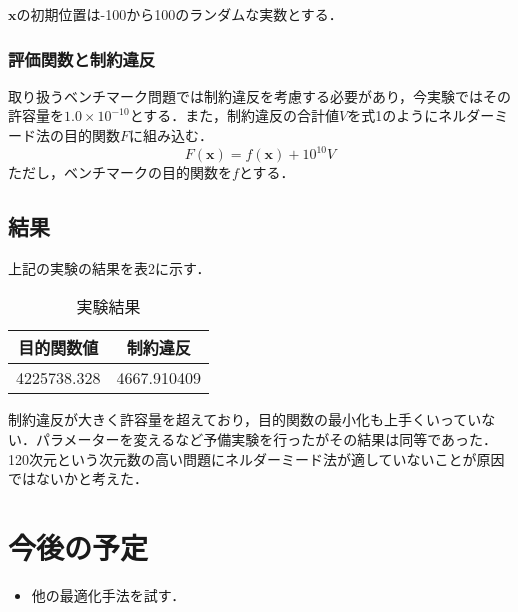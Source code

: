 \documentclass[twocolumn]{jarticle}
\begin{document}
	$\bm{x}$の初期位置は-100から100のランダムな実数とする．
	\subsubsection{評価関数と制約違反}
	取り扱うベンチマーク問題では制約違反を考慮する必要があり，今実験ではその許容量を$1.0\times10^{-10}$とする．また，制約違反の合計値$V$を式1のようにネルダーミード法の目的関数$F$に組み込む．
	\begin{equation}
		F(\bm{x}) = f(\bm{x}) +  10^{10}V 
	\end{equation}
	ただし，ベンチマークの目的関数を$f$とする．
	
	\subsection{結果}
	上記の実験の結果を表2に示す．
	\begin{table}[htbp]
		\begin{center}
			\caption{実験結果}
			\begin{tabular}{| c | c |} \hline
				目的関数値 & 制約違反 \\ \hline 
				4225738.328 &  4667.910409 \\ \hline
			\end{tabular}
		\end{center}
	\end{table}

	制約違反が大きく許容量を超えており，目的関数の最小化も上手くいっていない．パラメーターを変えるなど予備実験を行ったがその結果は同等であった．120次元という次元数の高い問題にネルダーミード法が適していないことが原因ではないかと考えた．

	
\section{今後の予定}

\begin{itemize}
  \item 他の最適化手法を試す．
\end{itemize}

\end{document}

